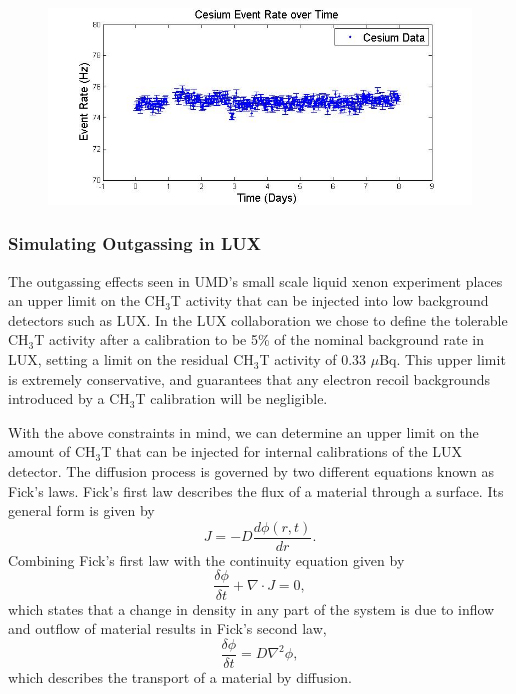 \begin{figure}
\includegraphics[scale=.35]{Cesium_TimeHisto.jpg} 
\label{UMDCsData}
\end{figure}

\subsubsection{Simulating Outgassing in LUX} \label{SimOutgas}

The outgassing effects seen in UMD's small scale liquid xenon experiment places an upper limit on the CH$_3$T activity that can be injected into low background detectors such as LUX.   In the LUX collaboration we chose to define the tolerable CH$_3$T activity after a calibration to be 5\% of the nominal background rate in LUX, setting a limit on the residual CH$_3$T activity of 0.33 $\mu$Bq.  This upper limit is extremely conservative, and guarantees that any electron recoil backgrounds introduced by a CH$_3$T calibration will be negligible. 

With the above constraints in mind, we can determine an upper limit on the amount of CH$_3$T that can be injected for internal calibrations of the LUX detector. The diffusion process is governed by two different equations known as Fick's laws. Fick's first law describes the flux of a material through a surface. Its general form is given by
\begin{equation}
J=-D\frac{d \phi(r,t)}{d r}.
\end{equation}
Combining Fick's first law with the continuity equation given by
\begin{equation}
\frac{\delta \phi}{\delta t} + \nabla \cdot J = 0,
\end{equation}
which states that a change in density in any part of the system is due to inflow and outflow of material results in Fick's second law,
\begin{equation}
\frac{\delta \phi}{\delta t} = D \nabla^2 \phi,
\end{equation}
which describes the transport of a material by diffusion.

